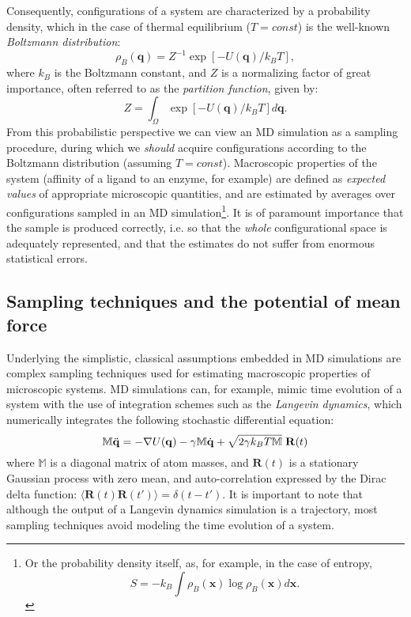 \documentclass[a4paper,11pt,twoside]{book}%
\begin{document}
Consequently, configurations of a system are characterized by a probability density, which in the case of thermal equilibrium ($T=const$) is the well-known \emph{Boltzmann distribution}:
\begin{equation}
 \rho_B(\mathbf{q})=Z^{-1} \exp[-U(\mathbf{q})/k_BT],
\end{equation}
where $k_B$ is the Boltzmann constant, and $Z$ is a normalizing factor of great importance, often referred to as the \emph{partition function}, given by: $$Z=\int_\Omega \exp[-U(\mathbf{q})/k_BT] d\mathbf{q}.$$
From this probabilistic perspective we can view an MD simulation as a sampling procedure, during which we \emph{should} acquire configurations according to the Boltzmann distribution (assuming $T=const$).
Macroscopic properties of the system (affinity of a ligand to an enzyme, for example) are defined as \emph{expected values} of appropriate microscopic quantities, and are estimated by averages over configurations sampled in an MD simulation\footnote{Or the probability density itself, as, for example, in the case of entropy, $$S=-k_B \int \rho_B(\mathbf{x})\log\rho_B(\mathbf{x}) d\mathbf{x}.$$}.
It is of paramount importance that the sample is produced correctly, i.e. so that the \emph{whole} configurational space is adequately represented, and that the estimates do not suffer from enormous statistical errors.

\subsection{Sampling techniques and the potential of mean force}

Underlying the simplistic, classical assumptions embedded in MD simulations are complex sampling techniques used for estimating macroscopic properties of microscopic systems.
MD simulations can, for example, mimic time evolution of a system with the use of integration schemes such as the \emph{Langevin dynamics}, which numerically integrates the following stochastic differential equation:
$$
 \mathbb{M}\ddot{\mathbf{q}} = -\nabla U(\mathbf{q}) -\gamma \mathbb{M}\dot{\mathbf{q}} + \sqrt{2\gamma k_BT\mathbb{M}}\hspace{0.1cm}\mathbf{R}(t)
$$
where $\mathbb{M}$ is a diagonal matrix of atom masses, and $\mathbf{R}(t)$ is a stationary Gaussian process with zero mean, and auto-correlation expressed by the Dirac delta function: $\langle \mathbf{R}(t)\mathbf{R}(t') \rangle = \delta(t-t')$. 
It is important to note that although the output of a Langevin dynamics simulation is a trajectory, most sampling techniques avoid modeling the time evolution of a system.
\end{document}

